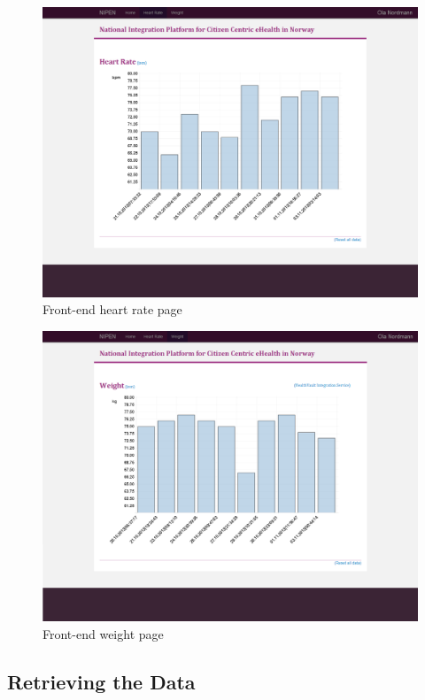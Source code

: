 \begin{figure}[H]
\centering
\includegraphics[scale=0.4]{../Figures/frontend-heart-rate-page.png}
\caption{Front-end heart rate page}
\label{figure:frontend-heart-rate-page}
\end{figure}

\begin{figure}[H]
\centering
\includegraphics[scale=0.4]{../Figures/frontend-weight-page.png}
\caption{Front-end weight page}
\label{figure:frontend-weight-page}
\end{figure}

\subsection{Retrieving the Data}

